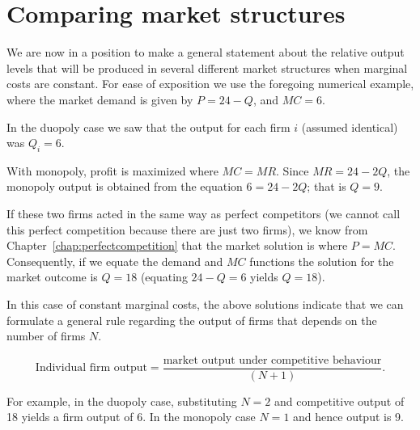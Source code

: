 \section{Comparing market structures}\label{sec:ch11sec6}

We are now in a position to make a general statement about the relative output levels that will be produced in several different market structures when marginal costs are constant. For ease of exposition we use the foregoing numerical example, where the market demand is given by $P=24-Q$, and $MC=6$.

In the duopoly case we saw that the output for each firm $i$ (assumed identical) was $Q_i=6$.

With monopoly, profit is maximized where $MC=MR$. Since $MR=24-2Q$, the monopoly output is obtained from the equation $6=24-2Q$; that is $Q=9$.

If these two firms acted in the same way as perfect competitors (we cannot call this perfect competition because there are just two firms), we know from Chapter~\ref{chap:perfectcompetition} that the market solution is where $P=MC$. Consequently, if we equate the demand and $MC$ functions the solution for the market outcome is $Q=18$ (equating $24-Q=6$ yields $Q=18$).

In this case of constant marginal costs, the above solutions indicate that we can formulate a general rule regarding the output of firms that depends on the number of firms $N$.

\begin{equation*}
\text{Individual firm output}=\frac{\text{market output under competitive behaviour}}{(N + 1)}.
\end{equation*}

For example, in the duopoly case, substituting $N=2$ and competitive output of 18 yields a firm output of 6. In the monopoly case $N=1$ and hence output is 9.